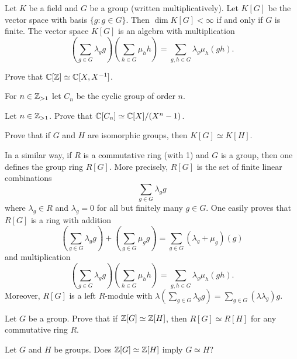 \chapter{}


Let $K$ be a field and $G$ be a group (written multiplicatively). Let $K[G]$ be the 
vector space with basis $\{g:g\in G\}$. Then $\dim K[G]<\infty$ if and only if $G$ 
is finite. The vector space $K[G]$ is an algebra
with multiplication
\[
\left(\sum_{g\in G}\lambda_gg\right)\left(\sum_{h\in G}\mu_hh\right)
=\sum_{g,h\in G}\lambda_g\mu_h(gh).
\]

\begin{exercise}
    Prove that $\mathbb{C}[\mathbb{Z}]\simeq\mathbb{C}[X,X^{-1}]$. 
\end{exercise}

For $n\in\mathbb{Z}_{>1}$
let $C_n$ be the cyclic group of order $n$.
    
\begin{exercise}
    Let $n\in\mathbb{Z}_{>1}$. Prove that $\mathbb{C}[C_n]\simeq\mathbb{C}[X]/(X^n-1)$. 
\end{exercise}

\begin{exercise}
    Prove that if $G$ and $H$ are isomorphic groups, then $K[G]\simeq K[H]$. 
\end{exercise}

In a similar way, if $R$ is a commutative ring (with 1) 
and $G$ is a group, then one defines the group ring $R[G]$. More precisely,
$R[G]$ is the set of finite linear combinations
\[
    \sum_{g\in G}\lambda_gg
\]
where $\lambda_g\in R$ and $\lambda_g=0$ for all but finitely many $g\in G$. 
One easily proves that $R[G]$ is a ring with 
addition
\[
\left(\sum_{g\in G}\lambda_gg\right)+\left(\sum_{g\in G}\mu_gg\right)
=\sum_{g\in G}(\lambda_g+\mu_g)(g)
\]
and multiplication 
\[
\left(\sum_{g\in G}\lambda_gg\right)\left(\sum_{h\in G}\mu_hh\right)
=\sum_{g,h\in G}\lambda_g\mu_h(gh).
\]
Moreover, $R[G]$ is a left $R$-module with
$\lambda(\sum_{g\in G}\lambda_gg)=\sum_{g\in G}(\lambda\lambda_g)g$. 

\begin{exercise}
    Let $G$ be a group. Prove that if 
    $\mathbb{Z}[G]\simeq\mathbb{Z}[H]$, then $R[G]\simeq R[H]$ for any commutative ring $R$.      
\end{exercise}

\begin{question}
\label{question:IP}
    Let $G$ and $H$ be groups. Does $\mathbb{Z}[G]\simeq\mathbb{Z}[H]$ imply $G\simeq H$?
\end{question}   

